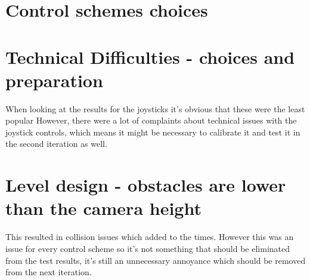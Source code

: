 \section{Control schemes choices}
\section{Technical Difficulties - choices and preparation} 
When looking at the results for the joysticks it's obvious that these were the least popular
However, there were a lot of complaints about technical issues with the joystick controls, which means it might be necessary to calibrate it and test it in the second iteration as well. 
\section{Level design - obstacles are lower than the camera height}
This resulted in collision issues which added to the times. However this was an issue for every control scheme so it's not something that should be eliminated from the test results, it's still an unnecessary annoyance which should be removed from the next iteration.